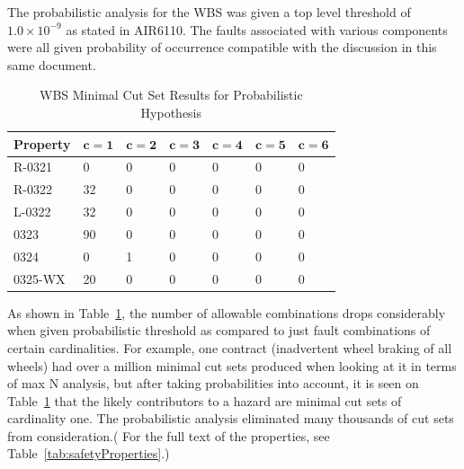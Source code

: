The probabilistic analysis for the WBS was given a top level threshold of $1.0 \times 10^{-9}$ as stated in AIR6110. The faults associated with various components were all given probability of occurrence compatible with the discussion in this same document. 
\begin{center}
\begin{table}[htbp]
    \begin{tabular}{ | l | l | l | l | l | l | l | }
    \hline
    \textbf{Property} & $\bm{c = 1}$ & $\bm{c = 2}$ & $\bm{c = 3}$ & $\bm{c = 4}$ 
		& $\bm{c = 5}$ & $\bm{c = 6}$   \\ \hline \hline
    R-0321 & 0 & 0 & 0 & 0 & 0 & 0  \\ \hline
    R-0322 & 32 & 0 & 0 &0 &0 &0  \\ \hline
    L-0322 & 32 & 0 & 0 & 0 & 0 & 0   \\ \hline
    0323 & 90 & 0 & 0 & 0 & 0 & 0   \\ \hline
    0324 & 0 & 1 & 0 & 0 & 0 & 0  \\ \hline
    0325-WX & 20 & 0 & 0 &0 &0 & 0   \\ \hline
    \end{tabular}
    \caption{WBS Minimal Cut Set Results for Probabilistic Hypothesis}
    \label{tab:wbs_prob_results}
\end{table}
\end{center}
As shown in Table~\ref{tab:wbs_prob_results}, the number of allowable combinations drops considerably when given probabilistic threshold as compared to just fault combinations of certain cardinalities. For example, one contract (inadvertent wheel braking of all wheels) had over a million minimal cut sets produced when looking at it in terms of max N analysis, but after taking probabilities into account, it is seen on Table~\ref{tab:wbs_prob_results} that the likely contributors to a hazard are minimal cut sets of cardinality one. The probabilistic analysis eliminated many thousands of cut sets from consideration.( For the full text of the properties, see Table~\ref{tab:safetyProperties}.)


